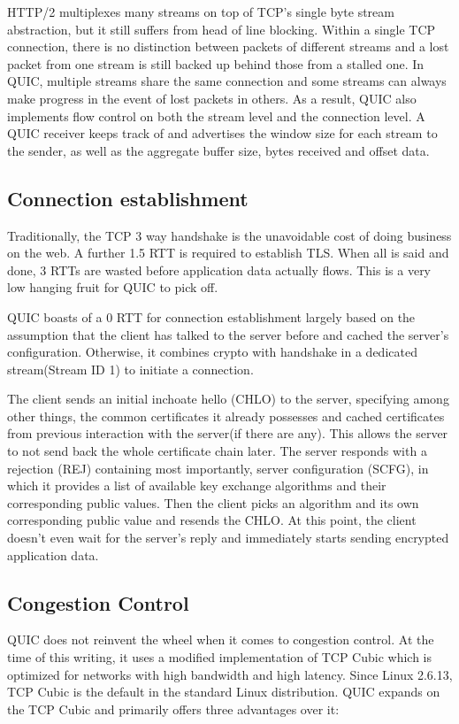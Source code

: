 \documentclass{sig-alternate-05-2015}
\begin{document}
HTTP/2 multiplexes many streams on top of TCP's single byte stream abstraction, but it still suffers from head of line blocking. Within a single TCP connection, there is no distinction between packets of different streams and a lost packet from one stream is still backed up behind those from a stalled one. In QUIC, multiple streams share the same connection and some streams can always make progress in the event of lost packets in others. As a result, QUIC also implements flow control on both the stream level and the connection level. A QUIC receiver keeps track of and advertises the window size for each stream to the sender, as well as the aggregate buffer size, bytes received and offset data. \cite{quic:draft}

\subsection{Connection establishment}
Traditionally, the TCP 3 way handshake is the unavoidable cost of doing business on the web. A further 1.5 RTT is required to establish TLS. When all is said and done, 3 RTTs are wasted before application data actually flows. This is a very low hanging fruit for QUIC to pick off. 

QUIC boasts of a 0 RTT for connection establishment largely based on the assumption that the client has talked to the server before and cached the server's configuration. Otherwise, it combines crypto with handshake in a dedicated stream(Stream ID 1) to initiate a connection.

The client sends an initial inchoate hello (CHLO) to the server, specifying among other things, the common certificates it already possesses and cached certificates from previous interaction with the server(if there are any). This allows the server to not send back the whole certificate chain later. The server responds with a rejection (REJ) containing most importantly, server configuration (SCFG), in which it provides a list of available key exchange algorithms and their corresponding public values. Then the client picks an algorithm and its own corresponding public value and resends the CHLO. At this point, the client doesn't even wait for the server's reply and immediately starts sending encrypted application data. \cite{quic:crypto}

\subsection{Congestion Control}
QUIC does not reinvent the wheel when it comes to congestion control. At the time of this writing, it uses a modified implementation of TCP Cubic which is optimized for networks with high bandwidth and high latency. Since Linux 2.6.13, TCP Cubic is the default in the standard Linux distribution. QUIC expands on the TCP Cubic and primarily offers three advantages\cite{quic:draft} over it:
\end{document}
